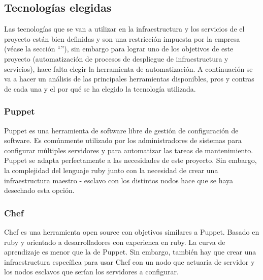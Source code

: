 	\subsection{Tecnologías elegidas}
	\label{tecnologias_elegidas}
		\begin{text}
			Las tecnologías que se van a utilizar en la infraestructura y los servicios de el proyecto están bien definidas y son una restricción impuesta por la empresa (véase la sección ``''), sin embargo para lograr uno de los objetivos de este proyecto (automatización de procesos de despliegue de infraestructura y servicios), hace falta elegir la herramienta de automatización. A continuación se va a hacer un análisis de las principales herramientas disponibles, pros y contras de cada una y el por qué se ha elegido la tecnología utilizada. \cite{comparadorAnsibleChefPuppet:online}
		\end{text}
	\subsubsection{Puppet}
		\begin{text}
			Puppet es una herramienta de software libre de gestión de configuración de software. Es comúnmente utilizado por los administradores de sistemas para configurar múltiples servidores y para automatizar las tareas de mantenimiento. Puppet se adapta perfectamente a las necesidades de este proyecto. Sin embargo, la complejidad del lenguaje ruby junto con la necesidad de crear una infraestructura maestro - esclavo con los distintos nodos hace que se haya desechado esta opción. \cite{puppet:online}
		\end{text}
		\clearpage
	\subsubsection{Chef}
		\begin{text}
			Chef es una herramienta open source con objetivos similares a Puppet. Basado en ruby y orientado a desarrolladores con experienca en ruby. La curva de aprendizaje es menor que la de Puppet. Sin embargo, también hay que crear una infraestructura específica para usar Chef con un nodo que actuaria de servidor y los nodos esclavos que serían los servidores a configurar. \cite{chef:online}
		\end{text}
